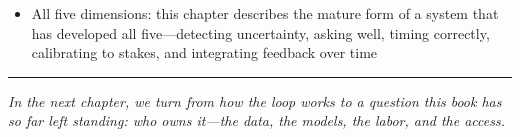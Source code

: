 \begin{itemize}
  \item All five dimensions: this chapter describes the mature form of a system that has developed all five---detecting uncertainty, asking well, timing correctly, calibrating to stakes, and integrating feedback over time
\end{itemize}

\bigskip
\begin{center}
\rule{0.5\textwidth}{0.4pt}
\end{center}
\bigskip

\noindent\textit{In the next chapter, we turn from how the loop works to a question this book has so far left standing: who owns it---the data, the models, the labor, and the access.}
